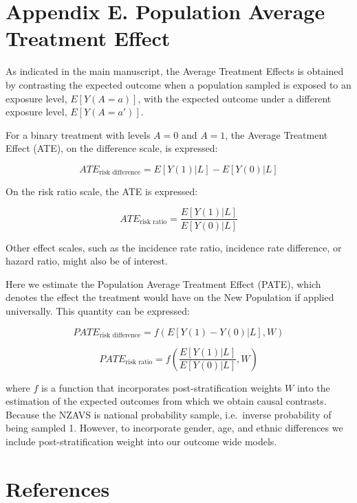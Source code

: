 \documentclass[
  singlecolumn]{report}
\begin{document}
\newpage{}

\hypertarget{appendix-e.-population-average-treatment-effect}{%
\section{Appendix E. Population Average Treatment
Effect}\label{appendix-e.-population-average-treatment-effect}}

As indicated in the main manuscript, the Average Treatment Effects is
obtained by contrasting the expected outcome when a population sampled
is exposed to an exposure level, \(E[Y(A = a)]\), with the expected
outcome under a different exposure level, \(E[Y(A=a')]\).

For a binary treatment with levels \(A=0\) and \(A=1\), the Average
Treatment Effect (ATE), on the difference scale, is expressed:

\[ATE_{\text{risk difference}} = E[Y(1)|L] - E[Y(0)|L]\]

On the risk ratio scale, the ATE is expressed:

\[ATE_{\text{risk ratio}} = \frac{E[Y(1)|L]}{E[Y(0)|L]}\]

Other effect scales, such as the incidence rate ratio, incidence rate
difference, or hazard ratio, might also be of interest.

Here we estimate the Population Average Treatment Effect (PATE), which
denotes the effect the treatment would have on the New Population if
applied universally. This quantity can be expressed:

\[PATE_{\text{risk difference}} = f(E[Y(1) - Y(0)|L], W)\]

\[PATE_{\text{risk ratio}} = f\left(\frac{E[Y(1)|L]}{E[Y(0)|L]}, W\right)\]

where \(f\) is a function that incorporates post-stratification weights
\(W\) into the estimation of the expected outcomes from which we obtain
causal contrasts. Because the NZAVS is national probability sample,
i.e.~inverse probability of being sampled 1. However, to incorporate
gender, age, and ethnic differences we include post-stratification
weight into our outcome wide models.

\hypertarget{references}{%
\section*{References}\label{references}}
\end{document}
